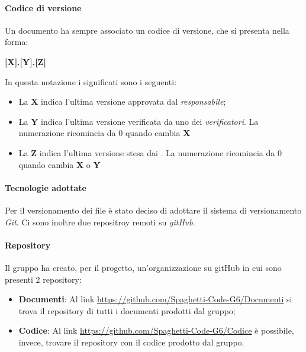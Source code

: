 \documentclass[../norme_di_progetto.tex]{subfiles}
\begin{document}
\paragraph{Codice di versione}
Un documento ha sempre associato un codice di versione, che si presenta nella forma:
\begin{center}
    \textbf{[X].[Y].[Z]}
\end{center}

In questa notazione i significati sono i seguenti:
\begin{itemize}
    \item La \textbf{X} indica l'ultima versione approvata dal \emph{responsabile};
    \item La \textbf{Y} indica l'ultima versione verificata da uno dei \emph{verificatori}. La numerazione ricomincia da 0 quando cambia \textbf{X}
    \item La \textbf{Z} indica l'ultima versione stesa dai . La numerazione ricomincia da 0 quando cambia \textbf{X} o \textbf{Y}
\end{itemize}

\paragraph{Tecnologie adottate}
Per il versionamento dei file è stato deciso di adottare il sistema di versionamento \emph{Git}. Ci sono inoltre due repositroy remoti su \emph{gitHub}.

\paragraph{Repository}
Il gruppo ha creato, per il progetto, un'organizzazione su gitHub in cui sono presenti 2 repository:
\begin{itemize}
    \item \textbf{Documenti}: Al link \url{https://github.com/Spaghetti-Code-G6/Documenti} si trova il repository di tutti i documenti prodotti dal gruppo;
    \item \textbf{Codice}: Al link \url{https://github.com/Spaghetti-Code-G6/Codice} è possibile, invece, trovare il repository con il codice prodotto dal gruppo.
\end{itemize}
\end{document}

